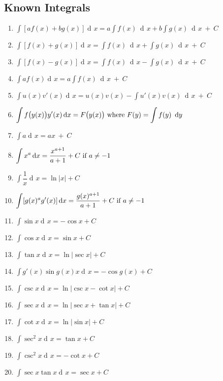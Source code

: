 \documentclass{article}
\newcommand{\dee}{\mathop{\mathrm{d}\!}}
\begin{document}
\begin{multicols*}{2}
    \section{Known Integrals}
    \begin{enumerate}
        \item $\displaystyle \int [af(x)+bg(x)] \dee x = a\int f(x)\ \dee{x}+b\int g(x)\ \dee{x}\ +\ C$
        \item $\displaystyle \int [f(x)+g(x)] \dee x = \int f(x)\ \dee{x}+\int g(x)\ \dee{x}\ +\ C$
        \item $\displaystyle \int [f(x)-g(x)] \dee x = \int f(x)\ \dee{x}-\int g(x)\ \dee{x}\ +\ C$
        \item $\displaystyle \int af(x) \dee x = a\int f(x)\ \dee{x}\ +\ C$
        \item $\displaystyle \int u(x)v'(x) \dee x = u(x)v(x)-\int u'(x)v(x)\ \dee{x}\ +\ C$
        \item $\displaystyle \int f\big(y(x)\big)y'(x) \dee x = F\big(y(x)\big)\\\hbox{ where }F(y)=\int f(y)\ \dee{y}$
        \item $\displaystyle \int a \dee x = ax\ +\ C$
        \item $\displaystyle \int x^a \dee x = \frac{x^{a+1}}{a+1}+C\hbox{ if }a\ne-1$
        \item $\displaystyle \int \dfrac{1}{x} \dee x = \ln|x|+C$
        \item $\displaystyle \int [g(x)^ag'(x)] \dee x= \frac{g(x)^{a+1}}{a+1}+C\hbox{ if }a\ne -1$
        \item $\displaystyle \int \sin x \dee x = -\cos x + C$
        \item $\displaystyle \int \cos x \dee x = \sin x + C$
        \item $\displaystyle \int \tan x \dee x = \ln|\sec x| + C$
        \item $\displaystyle \int g'(x)\sin g(x) x \dee x = -\cos g(x)+C$
        \item $\displaystyle \int \csc x \dee x = \ln |\csc x-\cot x|+C$
        \item $\displaystyle \int \sec x \dee x = \ln |\sec x+\tan x|+C$
        \item $\displaystyle \int \cot x \dee x = \ln|\sin x|+C$
        \item $\displaystyle \int \sec^2 x \dee x = \tan x+C$
        \item $\displaystyle \int \csc^2 x \dee x = -\cot x+C$
        \item $\displaystyle \int \sec x\tan x \dee x = \sec x+C$

\end{enumerate}
\end{multicols*}
\end{document}
